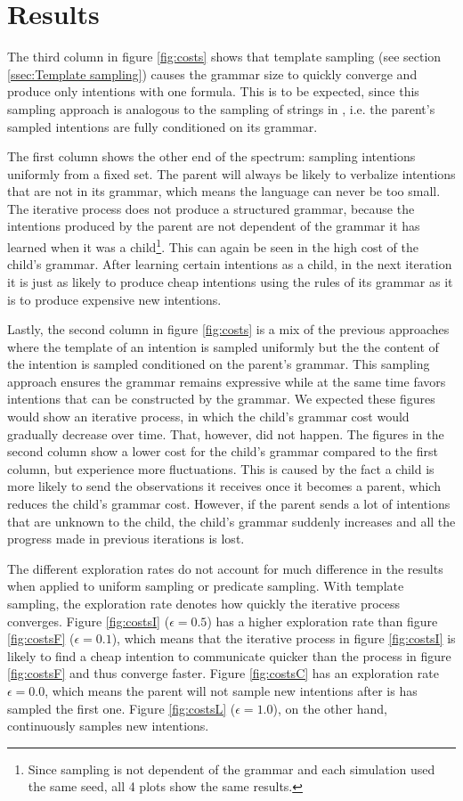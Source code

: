 \documentclass[a4paper]{article}
\begin{document}
\section{Results}
\label{sec:results}
The third column in figure \ref{fig:costs} shows that template sampling (see section \ref{ssec:Template sampling}) causes the grammar size to quickly converge and produce only intentions with one formula. This is to be expected, since this sampling approach is analogous to the sampling of strings in \cite{zuidema2003poverty}, i.e. the parent's sampled intentions are fully conditioned on its grammar.

The first column shows the other end of the spectrum: sampling intentions uniformly from a fixed set. The parent will always be likely to verbalize intentions that are not in its grammar, which means the language can never be too small. The iterative process does not produce a structured grammar, because the intentions produced by the parent are not dependent of the grammar it has learned when it was a child\footnote{Since sampling is not dependent of the grammar and each simulation used the same seed, all 4 plots show the same results.}. This can again be seen in the high cost of the child's grammar. After learning certain intentions as a child, in the next iteration it is just as likely to produce cheap intentions using the rules of its grammar as it is to produce expensive new intentions.

Lastly, the second column in figure \ref{fig:costs} is a mix of the previous approaches where the template of an intention is sampled uniformly but the the content of the intention is sampled conditioned on the parent's grammar. This sampling approach ensures the grammar remains expressive while at the same time favors intentions that can be constructed by the grammar. We expected these figures would show an iterative process, in which the child's grammar cost would gradually decrease over time. That, however, did not happen. The figures in the second column show a lower cost for the child's grammar compared to the first column, but experience more fluctuations. This is caused by the fact a child is more likely to send the observations it receives once it becomes a parent, which reduces the child's grammar cost. However, if the parent sends a lot of intentions that are unknown to the child, the child's grammar suddenly increases and all the progress made in previous iterations is lost.

The different exploration rates do not account for much difference in the results when applied to uniform sampling or predicate sampling. With template sampling, the exploration rate denotes how quickly the iterative process converges. Figure \ref{fig:costsI} ($\epsilon = 0.5$) has a higher exploration rate than figure \ref{fig:costsF} ($\epsilon = 0.1$), which means that the iterative process in figure \ref{fig:costsI} is likely to find a cheap intention to communicate quicker than the process in figure \ref{fig:costsF} and thus converge faster. Figure \ref{fig:costsC} has an exploration rate $\epsilon = 0.0$, which means the parent will not sample new intentions after is has sampled the first one. Figure \ref{fig:costsL} ($\epsilon = 1.0$), on the other hand, continuously samples new intentions. 
\end{document}
